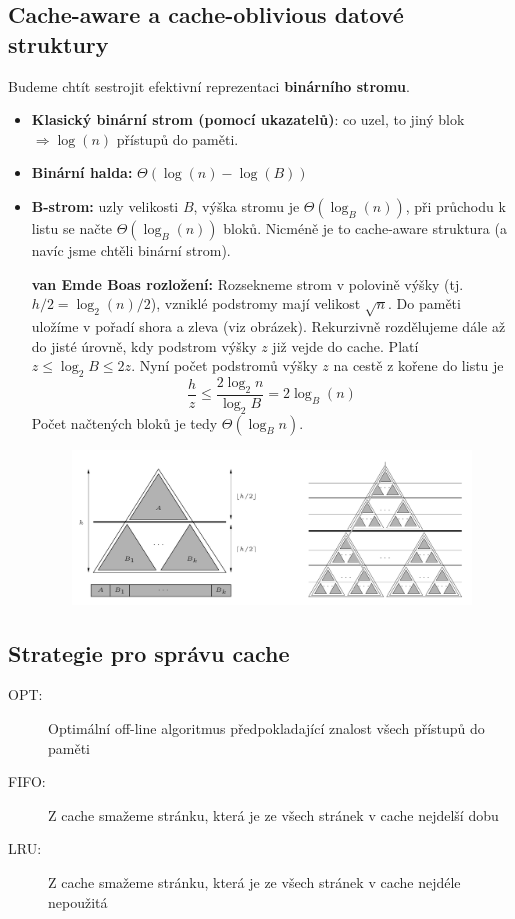 \documentclass[11pt]{report} %
\numberwithin{equation}{section}
\begin{document}
\subsection{Cache-aware a cache-oblivious datové struktury}
Budeme chtít sestrojit efektivní reprezentaci \textbf{binárního stromu}.
\begin{itemize}
\item \textbf{Klasický binární strom (pomocí ukazatelů)}: co uzel, to jiný blok $\Rightarrow \log (n)$ přístupů do paměti.

\item \textbf{Binární halda:} $\Theta(\log(n) - \log(B))$

\item \textbf{B-strom:} uzly velikosti $B$, výška stromu je $\Theta(\log_B(n))$, při průchodu k listu se načte $\Theta(\log_B(n))$ bloků. Nicméně je to cache-aware struktura (a navíc jsme chtěli binární strom).

\textbf{van Emde Boas rozložení:} Rozsekneme strom v polovině výšky (tj. $h/2 = \log_2(n)/2$), vzniklé podstromy mají velikost $\sqrt{n}$. Do paměti uložíme v pořadí shora a zleva (viz obrázek). Rekurzivně rozdělujeme dále až do jisté úrovně, kdy podstrom výšky $z$ již vejde do cache. Platí $z \leq \log_2 B \leq 2z$.  Nyní počet podstromů výšky $z$ na cestě z kořene do listu je $$\frac{h}{z} \leq \frac{2\log_2 n}{\log_2 B} = 2\log_B(n)$$
Počet načtených bloků je tedy $\Theta(\log_B n)$.

\begin{figure}[H]
	\centering
	\includegraphics[]{img/vanemdeboas.png}
\end{figure}
	
\end{itemize}


\subsection{Strategie pro správu cache}
\begin{description}
	\item[OPT:] Optimální off-line algoritmus předpokladající znalost všech přístupů do paměti
	\item[FIFO:] Z cache smažeme stránku, která je ze všech stránek v cache nejdelší dobu
	\item[LRU:] Z cache smažeme stránku, která je ze všech stránek v cache nejdéle nepoužitá
\end{description}
\end{document}
